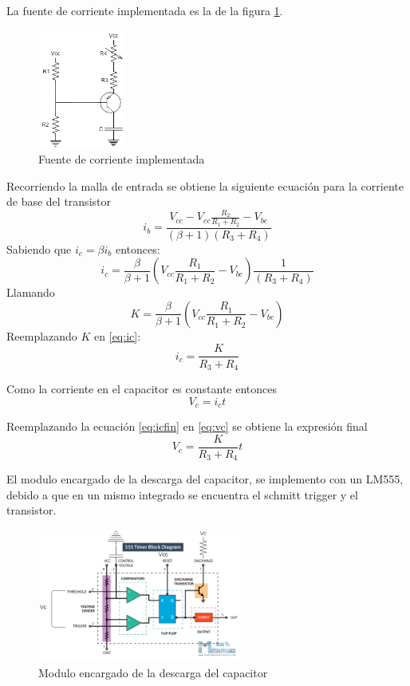 \documentclass[../../ASSD_TP1_G7.tex]{subfiles}
\begin{document}
La fuente de corriente implementada es la de la figura \ref{fig:fuenteCorriente}. 
\begin{figure}[H]
\centering
\includegraphics[width=0.25\textwidth]{figures/fCorriente.png}
\caption{Fuente de corriente implementada}\label{fig:fuenteCorriente}
\end{figure}
Recorriendo la malla de entrada se obtiene la siguiente ecuación para la corriente de base del transistor
\begin{equation}
i_b=\frac{V_{cc}-V_{cc}\frac{R_2}{R_1 + R_2}-V_{be}}{(\beta + 1)(R_3 + R_4)}
\end{equation}
Sabiendo que $i_c=\beta i_b$ entonces:
\begin{equation}
i_c= \frac{\beta}{\beta + 1} \left( V_{cc} \frac{R_1}{R_1 + R_2} -V_{be} \right) \frac{1}{(R_3 + R_4)} \label{eq:ic}
\end{equation}
Llamando 
\begin{equation}
K=\frac{\beta}{\beta + 1} \left( V_{cc} \frac{R_1}{R_1 + R_2} -V_{be} \right)
\end{equation}
Reemplazando $K$ en \ref{eq:ic}:
\begin{equation}
i_c=\frac{K}{R_3 + R_4} \label{eq:icfin}
\end{equation}

Como la corriente en el capacitor es constante entonces
\begin{equation}
V_c=i_c t \label{eq:vc}
\end{equation}

Reemplazando la ecuación \ref{eq:icfin} en \ref{eq:vc} se obtiene la expresión final
\begin{equation}
V_c=\frac{K}{R_3 + R_4} t 
\end{equation}

\par El modulo encargado de la descarga del capacitor, se implemento con un LM555, debido a que en un mismo integrado se encuentra el schmitt trigger y el transistor. 
\begin{figure}[H]
\centering
\includegraphics[width=0.6\textwidth]{figures/descargaC.png}
\caption{Modulo encargado de la descarga del capacitor}\label{fig:descargac}
\end{figure}
\end{document}
